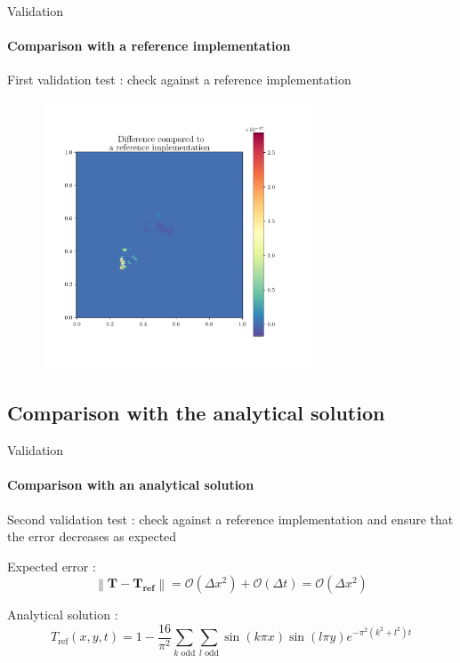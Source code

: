 \documentclass[aspectratio=169]{beamer}
\newcommand{\bigoh}{\mathcal{O}}
\newcommand\norm[1]{\left\lVert#1\right\rVert}
\begin{document}

\begin{frame}{Validation}
    \framesubtitle{Comparison with a reference implementation}
    First validation test : check against a reference implementation
    \begin{figure}
        \centering
        \includegraphics[height=8cm]{Figures/solcomp.pdf}
    \end{figure}
\end{frame}


\subsection{Comparison with the analytical solution}

\begin{frame}{Validation}
    \framesubtitle{Comparison with an analytical solution}
    Second validation test : check against a reference implementation and ensure that the error decreases as expected

    \vfill
    Expected error :
    \[
        \norm{\bm{T-T_\text{ref}}} = \bigoh(\Delta x^2) + \bigoh(\Delta t) = \bigoh(\Delta x^2)
    \]

    \vfill
    Analytical solution :
    \[
        T_\text{ref}(x, y, t) = 1- \dfrac{16}{\pi^2} \sum_{k \text{ odd}} \sum_{l \text{ odd}} \sin(k \pi x) \sin(l \pi y) e^{-\pi^2(k^2 + l^2) t}
    \]
    
\end{frame}

\end{document}
